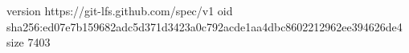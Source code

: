 version https://git-lfs.github.com/spec/v1
oid sha256:ed07e7b159682adc5d371d3423a0c792acde1aa4dbc8602212962ee394626de4
size 7403
